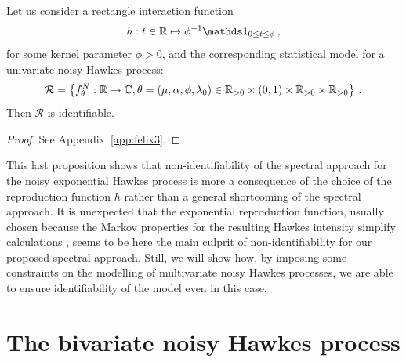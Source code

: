 \begin{proposition}\label{prop:chap4_rectangle}
  Let us consider a rectangle interaction function
  \[
    h : t \in \RR \mapsto \phi^{-1} \II_{0 \le t \le \phi}\,,
  \]
  for some kernel parameter $\phi > 0$,
  and the corresponding statistical model for a univariate noisy Hawkes process:
	\begin{equation*}
		\mathcal R = \left \{ f_\theta^N: {\mathbb R} \to \mathbb C, \theta = (\mu, \alpha, \phi, \lambda_0) \in \mathbb R_{>0} \times (0, 1) \times \mathbb R_{>0} \times \mathbb R_{>0} \right\} \,.
	\end{equation*}
	Then $\mathcal R$ is identifiable.
\end{proposition}
\begin{proof}
  See Appendix~\ref{app:felix3}.
\end{proof}


This last proposition shows that non-identifiability of the spectral approach for the noisy exponential Hawkes process is more a consequence of the choice of the reproduction function $h$ rather than a general shortcoming of the spectral approach.
It is unexpected that the exponential reproduction function, usually chosen because the Markov properties for the resulting Hawkes intensity simplify calculations \parencite{Ozaki1979, DaFonseca2013, Duarte2019}, seems to be here the main culprit of non-identifiability for our proposed spectral approach. 
Still, we will show how, by imposing some constraints on the modelling of multivariate noisy Hawkes processes, we are able to ensure identifiability of the model even in this case.



    \section{The bivariate noisy Hawkes process}\label{sec:chap4_dim2}
    
